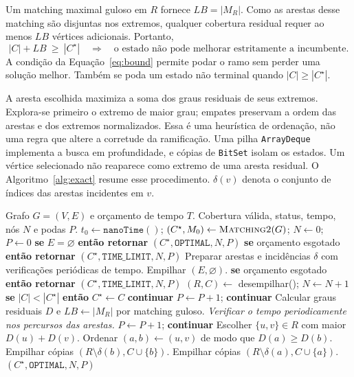 Um matching maximal guloso em $R$ fornece $LB=|M_R|$. Como as arestas
desse matching são disjuntas nos extremos, qualquer cobertura residual
requer ao menos $LB$ vértices adicionais. Portanto,
\begin{equation}
  |C|+LB\ \geq\ |C^\star|
  \quad\Longrightarrow\quad
  \text{o estado não pode melhorar estritamente a incumbente}.
  \label{eq:bound}
\end{equation}
A condição da Equação~\eqref{eq:bound} permite podar o ramo sem perder uma solução melhor.
Também se poda um estado não terminal quando $|C|\geq |C^\star|$.

A aresta escolhida maximiza a soma dos graus residuais de seus extremos.
Explora-se primeiro o extremo de maior grau; empates preservam a
ordem das arestas e dos extremos normalizados. Essa é uma heurística
de ordenação, não uma regra que altere a corretude da ramificação.
Uma pilha \texttt{ArrayDeque} implementa a busca em profundidade, e
cópias de \texttt{BitSet} isolam os estados. Um vértice selecionado
não reaparece como extremo de uma aresta residual.
O Algoritmo~\ref{alg:exact} resume esse procedimento. $\delta(v)$
denota o conjunto de índices das arestas incidentes em $v$.

\begin{algorithm}[htbp]
\caption{Branch and Bound implementado, com pilha explícita}
\label{alg:exact}
\small
\begin{algorithmic}[1]
\Require Grafo $G=(V,E)$ e orçamento de tempo $T$.
\Ensure Cobertura válida, status, tempo, nós $N$ e podas $P$.
\State $t_0\gets\texttt{nanoTime}()$; $(C^\star,M_0)\gets\Call{Matching2}{G}$; $N\gets0$; $P\gets0$
\State \textbf{se} $E=\varnothing$ \textbf{então retornar} $(C^\star,\texttt{OPTIMAL},N,P)$
\State \textbf{se} orçamento esgotado \textbf{então retornar} $(C^\star,\texttt{TIME\_LIMIT},N,P)$
\State Preparar arestas e incidências $\delta$ com verificações periódicas de tempo.
\State Empilhar $(E,\varnothing)$.
  \State \textbf{se} orçamento esgotado \textbf{então retornar} $(C^\star,\texttt{TIME\_LIMIT},N,P)$
  \State $(R,C)\gets$ desempilhar(); $N\gets N+1$
    \State \textbf{se} $|C|<|C^\star|$ \textbf{então} $C^\star\gets C$
    \State \textbf{continuar}
  \EndIf
    \State $P\gets P+1$; \textbf{continuar}
  \EndIf
  \State Calcular graus residuais $D$ e $LB\gets|M_R|$ por matching guloso.
  \State \textit{Verificar o tempo periodicamente nos percursos das arestas.}
    \State $P\gets P+1$; \textbf{continuar}
  \EndIf
  \State Escolher $\{u,v\}\in R$ com maior $D(u)+D(v)$.
  \State Ordenar $(a,b)\gets(u,v)$ de modo que $D(a)\geq D(b)$.
  \State Empilhar cópias $(R\setminus\delta(b),C\cup\{b\})$.
  \State Empilhar cópias $(R\setminus\delta(a),C\cup\{a\})$.
\EndWhile
\State \Return $(C^\star,\texttt{OPTIMAL},N,P)$
\end{algorithmic}
\end{algorithm}

